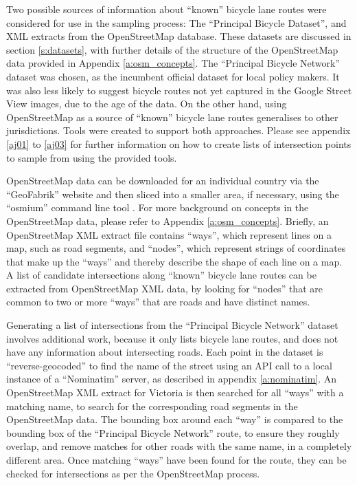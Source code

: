 \documentclass[11pt,twoside]{report}
\begin{document}
Two possible sources of information about ``known'' bicycle lane routes were considered for use in the sampling process:  The ``Principal Bicycle Dataset'', and XML extracts from the OpenStreetMap database.  These datasets are discussed in section \ref{s:datasets}, with further details of the structure of the OpenStreetMap data provided in Appendix \ref{a:osm_concepts}.  The ``Principal Bicycle Network'' dataset was chosen, as the incumbent official dataset for local policy makers.  It was also less likely to suggest bicycle routes not yet captured in the Google Street View images, due to the age of the data.  On the other hand, using OpenStreetMap as a source of ``known'' bicycle lane routes generalises to other jurisdictions.  Tools were created to support both approaches.  Please see appendix \ref{aj01} to \ref{aj03} for further information on how to create lists of intersection points to sample from using the provided tools.

OpenStreetMap data can be downloaded for an individual country via the ``GeoFabrik'' website \cite{geofabrik} and then sliced into a smaller area, if necessary, using the ``osmium'' command line tool \cite{osmium}.  For more background on concepts in the OpenStreetMap data, please refer to Appendix \ref{a:osm_concepts}.  Briefly, an OpenStreetMap XML extract file contains ``ways'', which represent lines on a map, such as road segments, and ``nodes'', which represent strings of coordinates that make up the ``ways'' and thereby describe the shape of each line on a map.  A list of candidate intersections along ``known'' bicycle lane routes can be extracted from OpenStreetMap XML data, by looking for ``nodes'' that are common to two or more ``ways'' that are roads and have distinct names.

Generating a list of intersections from the ``Principal Bicycle Network'' dataset involves additional work, because it only lists bicycle lane routes, and does not have any information about intersecting roads.  Each point in the dataset is ``reverse-geocoded'' to find the name of the street using an API call to a local instance of a ``Nominatim'' server, as described in appendix \ref{a:nominatim}.  An OpenStreetMap XML extract for Victoria is then searched for all ``ways'' with a matching name, to search for the corresponding road segments in the OpenStreetMap data.  The bounding box around each ``way'' is compared to the bounding box of the ``Principal Bicycle Network'' route, to ensure they roughly overlap, and remove matches for other roads with the same name, in a completely different area.  Once matching ``ways'' have been found for the route, they can be checked for intersections as per the OpenStreetMap process.
\end{document}
